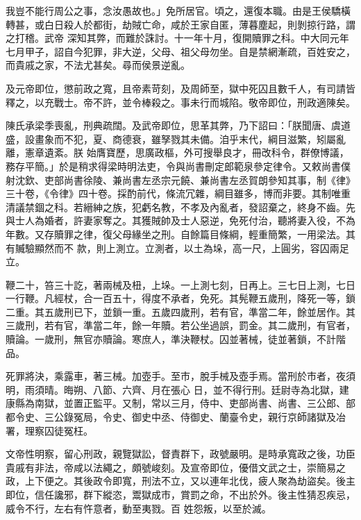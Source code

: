 \begin{pinyinscope}
 我豈不能行周公之事，念汝愚故也。」免所居官。頃之，還復本職。由是王侯驕橫轉甚，或白日殺人於都街，劫賊亡命，咸於王家自匿，薄暮塵起，則剝掠行路，謂之打稽。武帝
 深知其弊，而難於誅討。十一年十月，復開贖罪之科。中大同元年七月甲子，詔自今犯罪，非大逆，父母、祖父母勿坐。自是禁網漸疏，百姓安之，而貴戚之家，不法尤甚矣。尋而侯景逆亂。



 及元帝即位，懲前政之寬，且帝素苛刻，及周師至，獄中死囚且數千人，有司請皆釋之，以充戰士。帝不許，並令棒殺之。事未行而城陷。敬帝即位，刑政適陳矣。



 陳氏承梁季喪亂，刑典疏闊。及武帝即位，思革其弊，乃下詔曰：「朕聞唐、虞道盛，設畫象而不犯，夏、商德衰，雖孥戮其未備。洎乎末代，綱目滋繁，矧屬亂離，憲章遺紊。朕
 始膺寶歷，思廣政樞，外可搜舉良才，冊改科令，群僚博議，務存平簡。」於是稍求得梁時明法吏，令與尚書刪定郎範泉參定律令。又敕尚書僕射沈欽、吏部尚書徐陵、兼尚書左丞宗元饒、兼尚書左丞賀朗參知其事，制《律》三十卷，《令律》四十卷。採酌前代，條流冗雜，綱目雖多，博而非要。其制唯重清議禁錮之科。若縉紳之族，犯虧名教，不孝及內亂者，發詔棄之，終身不齒。先與士人為婚者，許妻家奪之。其獲賊帥及士人惡逆，免死付治，聽將妻入役，不為年數。又存贖罪之律，復父母緣坐之刑。自餘篇目條綱，輕重簡繁，一用梁法。其有贓驗顯然而不
 款，則上測立。立測者，以土為垛，高一尺，上圓劣，容囚兩足立。



 鞭二十，笞三十訖，著兩械及杻，上垛。一上測七刻，日再上。三七日上測，七日一行鞭。凡經杖，合一百五十，得度不承者，免死。其髡鞭五歲刑，降死一等，鎖二重。其五歲刑已下，並鎖一重。五歲四歲刑，若有官，準當二年，餘並居作。其三歲刑，若有官，準當二年，餘一年贖。若公坐過誤，罰金。其二歲刑，有官者，贖論。一歲刑，無官亦贖論。寒庶人，準決鞭杖。囚並著械，徒並著鎖，不計階品。



 死罪將決，乘露車，著三械。加壺手。至市，脫手械及壺手焉。當刑於市者，夜須明，雨須晴。晦朔、八節、六齊、月在張心
 日，並不得行刑。廷尉寺為北獄，建康縣為南獄，並置正監平。又制，常以三月，侍中、吏部尚書、尚書、三公郎、部都令史、三公錄冤局，令史、御史中丞、侍御史、蘭臺令史，親行京師諸獄及冶署，理察囚徒冤枉。



 文帝性明察，留心刑政，親覽獄訟，督責群下，政號嚴明。是時承寬政之後，功臣貴戚有非法，帝咸以法繩之，頗號峻刻。及宣帝即位，優借文武之士，崇簡易之政，上下便之。其後政令即寬，刑法不立，又以連年北伐，疲人聚為劫盜矣。後主即位，信任讒邪，群下縱恣，鬻獄成市，賞罰之命，不出於外。後主性猜忍疾忌，威令不行，左右有忤意者，動至夷戮。百
 姓怨叛，以至於滅。




\end{pinyinscope}
